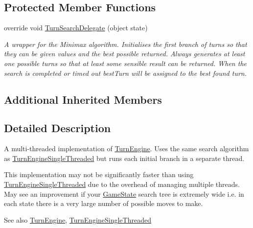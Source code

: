 \subsection*{Protected Member Functions}
\begin{DoxyCompactItemize}
\item 
override void \hyperlink{class_universal_turn_based_a_i_1_1_turn_engine_multi_threaded_a877d78f1b5b0f51ecf745bf5cf8fbb05}{Turn\+Search\+Delegate} (object state)
\begin{DoxyCompactList}\small\item\em A wrapper for the Minimax algorithm. Initialises the first branch of turns so that they can be given values and the best possible returned. Always generates at least one possible turns so that at least some sensible result can be returned. When the search is completed or timed out best\+Turn will be assigned to the best found turn. \end{DoxyCompactList}\end{DoxyCompactItemize}
\subsection*{Additional Inherited Members}


\subsection{Detailed Description}
A multi-\/threaded implementation of \hyperlink{class_universal_turn_based_a_i_1_1_turn_engine}{Turn\+Engine}. Uses the same search algorithm as \hyperlink{class_universal_turn_based_a_i_1_1_turn_engine_single_threaded}{Turn\+Engine\+Single\+Threaded} but runs each initial branch in a separate thread. 

This implementation may not be significantly faster than using \hyperlink{class_universal_turn_based_a_i_1_1_turn_engine_single_threaded}{Turn\+Engine\+Single\+Threaded} due to the overhead of managing multiple threads. May see an improvement if your \hyperlink{class_universal_turn_based_a_i_1_1_game_state}{Game\+State} search tree is extremely wide i.\+e. in each state there is a very large number of possible moves to make.

\begin{DoxySeeAlso}{See also}
\hyperlink{class_universal_turn_based_a_i_1_1_turn_engine}{Turn\+Engine}, \hyperlink{class_universal_turn_based_a_i_1_1_turn_engine_single_threaded}{Turn\+Engine\+Single\+Threaded}


\end{DoxySeeAlso}


